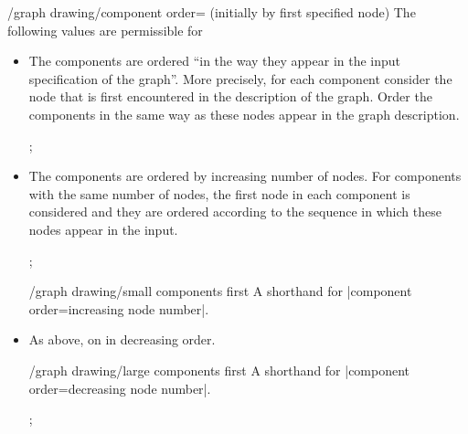 {\begin{key}{/graph drawing/component order= (initially
    by first specified node)}
  The following values are permissible for 
  \begin{itemize}
  \item {}

    The components are ordered ``in the way they appear in the input
    specification of the graph''. More precisely, for each component
    consider the node that is first encountered in the description
    of the graph. Order the components in the same way as these nodes
    appear in the graph description.
\begin{codeexample}[]
\tikz {};
\end{codeexample}
  \item {}
    
    The components are ordered by increasing number of nodes. For
    components with the same number of nodes, the first node in each
    component is considered and they are ordered according to the
    sequence in which these nodes appear in the input.
\begin{codeexample}[]
\tikz {};
\end{codeexample}
    \begin{key}{/graph drawing/small components first}
      A shorthand for |component order=increasing node number|.
    \end{key}
  \item {}
    As above, on in decreasing order.  
    \begin{key}{/graph drawing/large components first}
      A shorthand for |component order=decreasing node number|.
\begin{codeexample}[]
\tikz {};
\end{codeexample}
    \end{key}
  \end{itemize}
\end{key}


}
